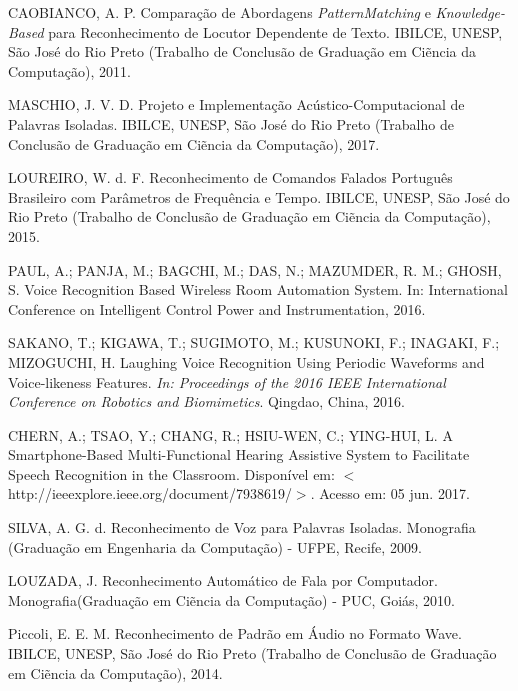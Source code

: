 \documentclass[a4paper,12pt,twoside,openright]{report}
\begin{document}
\begin{thebibliography}{00}
CAOBIANCO, A. P. Compara{\c c}\~{a}o de Abordagens \textit{PatternMatching} e \textit{Knowledge-Based} para Reconhecimento de Locutor Dependente de Texto. IBILCE, UNESP, S\~{a}o Jos\'{e} do Rio Preto (Trabalho de Conclus\~{a}o de Gradua{\c c}\~{a}o em Ci\~{e}ncia da Computa{\c c}\~{a}o), 2011.


MASCHIO, J. V. D. Projeto e Implementa{\c c}\~{a}o Ac\'{u}stico-Computacional de Palavras Isoladas. IBILCE, UNESP, S\~{a}o Jos\'{e} do Rio Preto (Trabalho de Conclus\~{a}o de Gradua{\c c}\~{a}o em Ci\~{e}ncia da Computa{\c c}\~{a}o), 2017.


LOUREIRO, W. d. F. Reconhecimento de Comandos Falados Portugu\^{e}s Brasileiro com Par\^{a}metros de Frequ\^{e}ncia e Tempo. IBILCE, UNESP, S\~{a}o Jos\'{e} do Rio Preto (Trabalho de Conclus\~{a}o de Gradua{\c c}\~{a}o em Ci\~{e}ncia da Computa{\c c}\~{a}o), 2015.


PAUL, A.; PANJA, M.; BAGCHI, M.; DAS, N.; MAZUMDER, R. M.; GHOSH, S. Voice Recognition Based Wireless Room Automation System. In: International Conference on Intelligent Control Power and Instrumentation, 2016.


SAKANO, T.; KIGAWA, T.; SUGIMOTO, M.; KUSUNOKI, F.; INAGAKI, F.; MIZOGUCHI, H. Laughing Voice Recognition Using Periodic Waveforms and Voice-likeness Features. \textit{In: Proceedings of the 2016 IEEE International Conference on Robotics and Biomimetics}. Qingdao, China, 2016.


CHERN, A.; TSAO, Y.; CHANG, R.; HSIU-WEN, C.; YING-HUI, L. A Smartphone-Based Multi-Functional Hearing Assistive System to Facilitate Speech Recognition in the Classroom. Dispon\'{i}vel em: $<$http://ieeexplore.ieee.org/document/7938619/$>$. Acesso em: 05 jun. 2017.


SILVA, A. G. d. Reconhecimento de Voz para Palavras Isoladas. Monografia (Gradua{\c c}\~{a}o em Engenharia da Computa{\c c}\~{a}o) - UFPE, Recife, 2009.


LOUZADA, J. Reconhecimento Autom\'{a}tico de Fala por Computador. Monografia(Gradua{\c c}\~{a}o em Ci\~{e}ncia da Computa{\c c}\~{a}o) - PUC, Goi\'{a}s, 2010.


Piccoli, E. E. M. Reconhecimento de Padr\~{a}o em \'{A}udio no Formato Wave. IBILCE, UNESP, S\~{a}o Jos\'{e} do Rio Preto (Trabalho de Conclus\~{a}o de Gradua{\c c}\~{a}o em Ci\~{e}ncia da Computa{\c c}\~{a}o), 2014.



\end{thebibliography}
\end{document}

